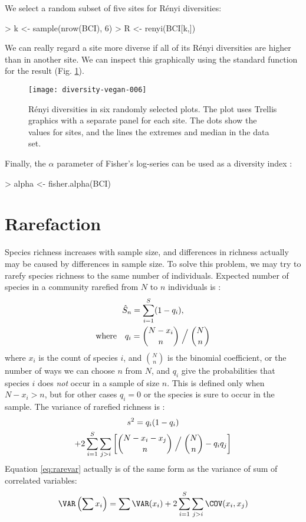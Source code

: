 \documentclass[a4paper,10pt,twocolumn]{article}
\begin{document}
We select a random subset of five sites for R\'{e}nyi diversities:
\begin{Schunk}
\begin{Sinput}
> k <- sample(nrow(BCI), 6)
> R <- renyi(BCI[k,])
\end{Sinput}
\end{Schunk}
We can really regard a site more diverse if all of its R\'{e}nyi
diversities are higher than in another site.  We can inspect this
graphically using the standard  function for the
 result (Fig. \ref{fig:renyi}).
\begin{figure}
\texttt{[image: diversity-vegan-006]}
\caption{R\'{e}nyi diversities in six randomly selected plots. The plot
  uses Trellis graphics with a separate panel for each site. The dots
  show the values for sites, and the lines the extremes and median in
  the data set.}
\label{fig:renyi}
\end{figure}

Finally, the $\alpha$ parameter of Fisher's log-series can be used as
a diversity index \citep{FisherEtal43}:
\begin{Schunk}
\begin{Sinput}
> alpha <- fisher.alpha(BCI)
\end{Sinput}
\end{Schunk}

\section{Rarefaction}

Species richness increases with sample size, and differences in
richness actually may be caused by differences in sample size.  To
solve this problem, we may try to rarefy species richness to the same
number of individuals.  Expected number of species in a community
rarefied from $N$ to $n$ individuals is \citep{Hurlbert71}:
\begin{multline}
\label{eq:rare}
\hat S_n = \sum_{i=1}^S (1 - q_i),\\ \text{where} \quad q_i = {N-x_i
  \choose n} \Bigm /{N \choose n}
\end{multline}
where $x_i$ is the count of species $i$, and ${N \choose n}$ is the
binomial coefficient, or the number of ways we can choose $n$ from
$N$, and $q_i$ give the probabilities that species $i$ does \emph{not} occur in a
sample of size $n$.  This is defined only when $N-x_i > n$, but for
other cases $q_i = 0$ or the species is sure to occur in the sample.
The variance of rarefied richness is \citep{HeckEtal75}:
\begin{multline}
\label{eq:rarevar}
s^2 = q_i (1-q_i)  \\ + 2 \sum_{i=1}^S \sum_{j>i} \left[ {N- x_i - x_j
    \choose n} \Bigm / {N
    \choose n} - q_i q_j\right]
\end{multline}
Equation \ref{eq:rarevar} actually is of the same form as the variance
of sum of correlated variables:
\begin{equation}
\VAR \left(\sum x_i \right) = \sum \VAR (x_i) + 2 \sum_{i=1}^S
\sum_{j>i} \COV (x_i, x_j)
\end{equation}
\end{document}
